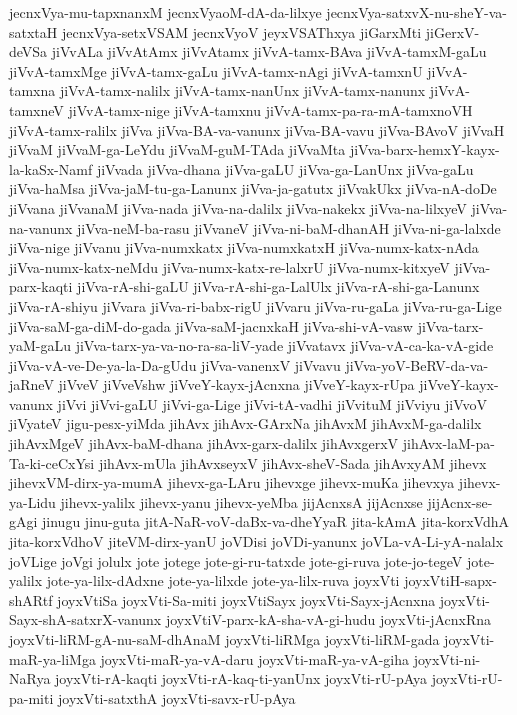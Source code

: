 {jecnxVya-mu-tapxnanxM
jecnxVyaoM-dA-da-lilxye
jecnxVya-satxvX-nu-sheY-va-satxtaH
jecnxVya-setxVSAM
jecnxVyoV
jeyxVSAThxya
jiGarxMti
jiGerxV-deVSa
jiVvALa
jiVvAtAmx
jiVvAtamx
jiVvA-tamx-BAva
jiVvA-tamxM-gaLu
jiVvA-tamxMge
jiVvA-tamx-gaLu
jiVvA-tamx-nAgi
jiVvA-tamxnU
jiVvA-tamxna
jiVvA-tamx-nalilx
jiVvA-tamx-nanUnx
jiVvA-tamx-nanunx
jiVvA-tamxneV
jiVvA-tamx-nige
jiVvA-tamxnu
jiVvA-tamx-pa-ra-mA-tamxnoVH
jiVvA-tamx-ralilx
jiVva
jiVva-BA-va-vanunx
jiVva-BA-vavu
jiVva-BAvoV
jiVvaH
jiVvaM
jiVvaM-ga-LeYdu
jiVvaM-guM-TAda
jiVvaMta
jiVva-barx-hemxY-kayx-la-kaSx-Namf
jiVvada
jiVva-dhana
jiVva-gaLU
jiVva-ga-LanUnx
jiVva-gaLu
jiVva-haMsa
jiVva-jaM-tu-ga-Lanunx
jiVva-ja-gatutx
jiVvakUkx
jiVva-nA-doDe
jiVvana
jiVvanaM
jiVva-nada
jiVva-na-dalilx
jiVva-nakekx
jiVva-na-lilxyeV
jiVva-na-vanunx
jiVva-neM-ba-rasu
jiVvaneV
jiVva-ni-baM-dhanAH
jiVva-ni-ga-lalxde
jiVva-nige
jiVvanu
jiVva-numxkatx
jiVva-numxkatxH
jiVva-numx-katx-nAda
jiVva-numx-katx-neMdu
jiVva-numx-katx-re-lalxrU
jiVva-numx-kitxyeV
jiVva-parx-kaqti
jiVva-rA-shi-gaLU
jiVva-rA-shi-ga-LalUlx
jiVva-rA-shi-ga-Lanunx
jiVva-rA-shiyu
jiVvara
jiVva-ri-babx-rigU
jiVvaru
jiVva-ru-gaLa
jiVva-ru-ga-Lige
jiVva-saM-ga-diM-do-gada
jiVva-saM-jacnxkaH
jiVva-shi-vA-vasw
jiVva-tarx-yaM-gaLu
jiVva-tarx-ya-va-no-ra-sa-liV-yade
jiVvatavx
jiVva-vA-ca-ka-vA-gide
jiVva-vA-ve-De-ya-la-Da-gUdu
jiVva-vanenxV
jiVvavu
jiVva-yoV-BeRV-da-va-jaRneV
jiVveV
jiVveVshw
jiVveY-kayx-jAcnxna
jiVveY-kayx-rUpa
jiVveY-kayx-vanunx
jiVvi
jiVvi-gaLU
jiVvi-ga-Lige
jiVvi-tA-vadhi
jiVvituM
jiVviyu
jiVvoV
jiVyateV
jigu-pesx-yiMda
jihAvx
jihAvx-GArxNa
jihAvxM
jihAvxM-ga-dalilx
jihAvxMgeV
jihAvx-baM-dhana
jihAvx-garx-dalilx
jihAvxgerxV
jihAvx-laM-pa-Ta-ki-ceCxYsi
jihAvx-mUla
jihAvxseyxV
jihAvx-sheV-Sada
jihAvxyAM
jihevx
jihevxVM-dirx-ya-mumA
jihevx-ga-LAru
jihevxge
jihevx-muKa
jihevxya
jihevx-ya-Lidu
jihevx-yalilx
jihevx-yanu
jihevx-yeMba
jijAcnxsA
jijAcnxse
jijAcnx-se-gAgi
jinugu
jinu-guta
jitA-NaR-voV-daBx-va-dheYyaR
jita-kAmA
jita-korxVdhA
jita-korxVdhoV
jiteVM-dirx-yanU
joVDisi
joVDi-yanunx
joVLa-vA-Li-yA-nalalx
joVLige
joVgi
jolulx
jote
jotege
jote-gi-ru-tatxde
jote-gi-ruva
jote-jo-tegeV
jote-yalilx
jote-ya-lilx-dAdxne
jote-ya-lilxde
jote-ya-lilx-ruva
joyxVti
joyxVtiH-sapx-shARtf
joyxVtiSa
joyxVti-Sa-miti
joyxVtiSayx
joyxVti-Sayx-jAcnxna
joyxVti-Sayx-shA-satxrX-vanunx
joyxVtiV-parx-kA-sha-vA-gi-hudu
joyxVti-jAcnxRna
joyxVti-liRM-gA-nu-saM-dhAnaM
joyxVti-liRMga
joyxVti-liRM-gada
joyxVti-maR-ya-liMga
joyxVti-maR-ya-vA-daru
joyxVti-maR-ya-vA-giha
joyxVti-ni-NaRya
joyxVti-rA-kaqti
joyxVti-rA-kaq-ti-yanUnx
joyxVti-rU-pAya
joyxVti-rU-pa-miti
joyxVti-satxthA
joyxVti-savx-rU-pAya
}
